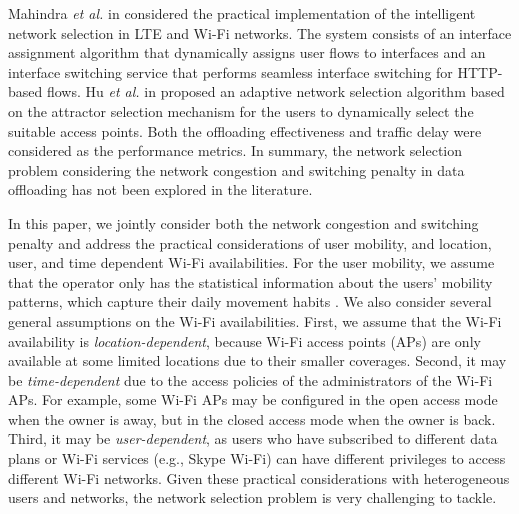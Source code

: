 \documentclass[journal]{IEEEtran}
\begin{document}
  Mahindra \emph{et al.} in \cite{mahindra_ap14} considered the practical implementation of the intelligent network selection in LTE and Wi-Fi networks. The system consists of an interface assignment algorithm that dynamically assigns user flows to interfaces and an interface switching service that performs seamless interface switching for HTTP-based flows.
	Hu \emph{et al.} in \cite{hu_an16} proposed an adaptive network selection algorithm based on the attractor selection mechanism for the users to dynamically select the suitable access points. Both the offloading effectiveness and traffic delay were considered as the performance metrics.
	In summary, the network selection problem considering the network congestion and switching penalty in data offloading has not been explored in the literature.
	
	In this paper, we jointly consider both the network congestion and switching penalty and address the practical considerations of user mobility, and location, user, and time dependent Wi-Fi availabilities.	
  For the user mobility, we assume that the operator only has the statistical information about the users' mobility patterns, which capture their daily movement habits \cite{ghosh_op06}. %
  We also consider several general assumptions on the Wi-Fi availabilities. First, we assume that the Wi-Fi availability is \emph{location-dependent}, because Wi-Fi access points (APs) are only available at some limited locations due to their smaller coverages. Second, it may be \emph{time-dependent} due to the access policies of the administrators of the Wi-Fi APs. For example, some Wi-Fi APs may be configured in the open access mode when the owner is away, but in the closed access mode when the owner is back. Third, it may be \emph{user-dependent}, as users who have subscribed to different data plans or Wi-Fi services (e.g., Skype Wi-Fi) can have different privileges to access different Wi-Fi networks. %
  Given these practical considerations with heterogeneous users and networks, the network selection problem is very challenging to tackle.
\end{document}
